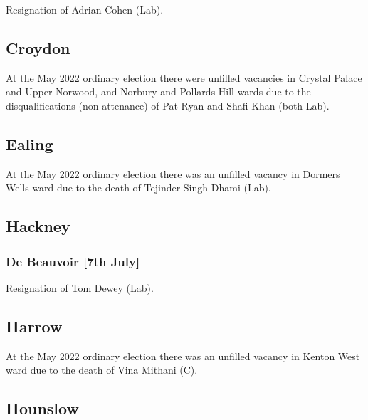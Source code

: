 \documentclass[a4paper,openany]{book}
\begin{document}
\begin{resultsiii}

Resignation of Adrian Cohen (Lab).

\subsection*{Croydon}

At the May 2022 ordinary election there were unfilled vacancies in Crystal Palace and Upper Norwood, and Norbury and Pollards Hill wards due to the disqualifications (non-attenance) of Pat Ryan and Shafi Khan (both Lab).%
%

\subsection*{Ealing}

At the May 2022 ordinary election there was an unfilled vacancy in Dormers Wells ward due to the death of Tejinder Singh Dhami (Lab).%

\subsection*{Hackney}

\subsubsection*{De Beauvoir \hspace*{\fill}\nolinebreak[1]%
	\enspace\hspace*{\fill}
	[7th July]}


Resignation of Tom Dewey (Lab).

\subsection*{Harrow}

At the May 2022 ordinary election there was an unfilled vacancy in Kenton West ward due to the death of Vina Mithani (C).%

\subsection*{Hounslow}


\end{resultsiii}
\end{document}

